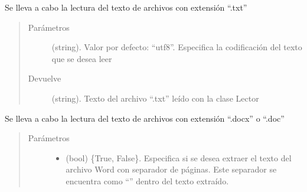 \documentclass[letterpaper,10pt,openany,spanish]{sphinxmanual}
\begin{document}
\begin{fulllineitems}
\begin{fulllineitems}
\end{fulllineitems}


\begin{fulllineitems}
\label{\detokenize{funciones/lectura:lectura.Lector.leer_txt}}
Se lleva a cabo la lectura del texto de archivos con extensión “.txt”
\begin{quote}\begin{description}
\item[{Parámetros}] \leavevmode
{} \textendash{} (string). Valor por defecto: “utf\sphinxhyphen{}8”. Especifica la codificación             del texto que se desea leer

\item[{Devuelve}] \leavevmode
(string). Texto del archivo “.txt” leído con la clase Lector

\end{description}\end{quote}

\end{fulllineitems}


\begin{fulllineitems}
\label{\detokenize{funciones/lectura:lectura.Lector.leer_word}}
Se lleva a cabo la lectura del texto de archivos con extensión “.docx” o “.doc”
\begin{quote}\begin{description}
\item[{Parámetros}] \leavevmode\begin{itemize}
\item {} 
 \textendash{} (bool) \{True, False\}. Especifica si se desea extraer el texto del             archivo Word con separador de páginas. Este separador se encuentra como “”             dentro del texto extraído.


\end{itemize}
\end{description}
\end{quote}
\end{fulllineitems}
\end{fulllineitems}
\end{document}
